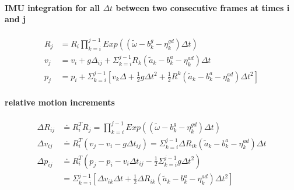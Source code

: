 \documentclass[10pt,a4paper]{article}
\begin{document}
\paragraph{IMU integration for all $\Delta t$ between two consecutive frames at times i and j}
\begin{subequations}
\begin{align}
	R_j &= R_i \prod_{k=i}^{j-1} Exp((\tilde{\omega} - b^g_k - \eta^{gd}_k) \Delta t) \\
	v_j &= v_i + g\Delta_{ij} + \Sigma_{k=i}^{j-1} R_k(\tilde{a}_k - b_k^a - \eta_k^{ad}) \Delta t \\
	p_j &= p_i + \Sigma_{k=i}^{j-1}[v_k\Delta + \frac{1}{2}g \Delta t^2 +
	\frac{1}{2} R^k (\tilde{a}_k - b_k^a - \eta_k^{ad}) \Delta t^2]
\end{align}
\end{subequations}

\paragraph{relative motion increments}
\begin{subequations}
	\begin{align}
	\Delta R_{ij} & \doteq R_i^T R_j = \prod_{k=i}^{j-1} Exp((\tilde{\omega} - b^g_k - \eta^{gd}_k) \Delta t) \\
	\Delta v_{ij} &\doteq R_i^T(v_j - v_i -g \Delta t_{ij}) = \Sigma_{k=i}^{j-1} \Delta R_{ik}(\tilde{a}_k - b_k^a -\eta_k^{ad}) \Delta t\\
	\Delta p_{ij} &\doteq R_i^T (p_j - p_i - v_i\Delta t_{ij} - \frac{1}{2} \Sigma_{k=i}^{j-1}g\Delta t^2)\\
	&= \Sigma_{k=i}^{j-1}[\Delta v_{ik}\Delta t + \frac{1}{2}\Delta R_{ik}(\tilde{a}_k - b_k^a -\eta_k^{ad}) \Delta t^2]
	\end{align}
\end{subequations}
\end{document}
